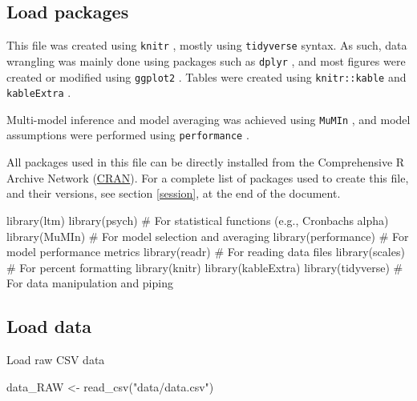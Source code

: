 \documentclass[
  bookmarksnumbered]{article}
\newenvironment{Shaded}{\begin{snugshade}}{\end{snugshade}}
\newcommand{\CommentTok}[1]{\textcolor[rgb]{0.50,0.62,0.50}{#1}}
\newcommand{\FunctionTok}[1]{\textcolor[rgb]{0.94,0.94,0.56}{#1}}
\newcommand{\NormalTok}[1]{\textcolor[rgb]{0.80,0.80,0.80}{#1}}
\newcommand{\OtherTok}[1]{\textcolor[rgb]{0.94,0.94,0.56}{#1}}
\newcommand{\StringTok}[1]{\textcolor[rgb]{0.80,0.58,0.58}{#1}}
\begin{document}
\subsection{Load packages}\label{load-packages}

This file was created using \texttt{knitr} \autocite{knitrcit}, mostly using \texttt{tidyverse} \autocite{tidyversecit} syntax. As such, data wrangling was mainly done using packages such as \texttt{dplyr} \autocite{dplyrcit}, and most figures were created or modified using \texttt{ggplot2} \autocite{ggplotcit}. Tables were created using \texttt{knitr::kable} and \texttt{kableExtra} \autocite{kableExtracit}.

Multi-model inference and model averaging was achieved using \texttt{MuMIn} \autocite{MuMIncit}, and model assumptions were performed using \texttt{performance} \autocite{ludecke2021}.

All packages used in this file can be directly installed from the Comprehensive R Archive Network (\href{https://cran.r-project.org/}{CRAN}). For a complete list of packages used to create this file, and their versions, see section \ref{session}, at the end of the document.

\begin{Shaded}
\begin{Highlighting}[]
\FunctionTok{library}\NormalTok{(ltm)}
\FunctionTok{library}\NormalTok{(psych)        }\CommentTok{\# For statistical functions (e.g., Cronbach\textquotesingle{}s alpha)}
\FunctionTok{library}\NormalTok{(MuMIn)        }\CommentTok{\# For model selection and averaging}
\FunctionTok{library}\NormalTok{(performance)  }\CommentTok{\# For model performance metrics}
\FunctionTok{library}\NormalTok{(readr)        }\CommentTok{\# For reading data files}
\FunctionTok{library}\NormalTok{(scales)       }\CommentTok{\# For percent formatting}
\FunctionTok{library}\NormalTok{(knitr)}
\FunctionTok{library}\NormalTok{(kableExtra)}
\FunctionTok{library}\NormalTok{(tidyverse)    }\CommentTok{\# For data manipulation and piping}
\end{Highlighting}
\end{Shaded}

\subsection{Load data}\label{load-data}

Load raw CSV data

\begin{Shaded}
\begin{Highlighting}[]
\NormalTok{data\_RAW }\OtherTok{\textless{}{-}} \FunctionTok{read\_csv}\NormalTok{(}\StringTok{"data/data.csv"}\NormalTok{)}
\end{Highlighting}
\end{Shaded}
\end{document}
